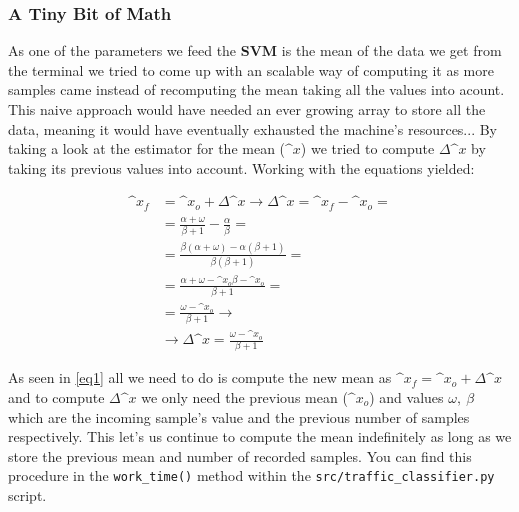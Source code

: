 \documentclass[12pt]{report}
\begin{document}
\begin{itemize}
{{{{			\subsubsection{A Tiny Bit of Math}
				As one of the parameters we feed the \textbf{SVM} is the mean of the data we get from the terminal we tried to come up with an scalable way of computing it as more samples came instead of recomputing the mean taking all the values into acount. This naive approach would have needed an ever growing array to store all the data, meaning it would have eventually exhausted the machine's resources... By taking a look at the estimator for the mean ($\^{x}$) we tried to compute $\Delta\^{x}$ by taking its previous values into account. Working with the equations yielded:

				\begin{equation}
					\label{eq1}
					\begin{split}
						\^{x}_f & = \^{x}_o + \Delta\^{x} \rightarrow \Delta\^{x} = \^{x}_f - \^{x}_o = \\
								& = \frac{\alpha + \omega}{\beta + 1} - \frac{\alpha}{\beta} = \\
								& = \frac{\beta(\alpha + \omega) - \alpha(\beta + 1)}{\beta(\beta + 1)} = \\
								& = \frac{\alpha + \omega - \^{x}_o\beta - \^{x}_o}{\beta + 1} = \\
								& = \frac{\omega - \^{x}_o}{\beta + 1} \rightarrow \\
								& \rightarrow \Delta\^{x} = \frac{\omega - \^{x}_o}{\beta + 1}
					\end{split}
				\end{equation}

				As seen in \ref{eq1} all we need to do is compute the new mean as $\^{x}_f = \^{x}_o + \Delta\^{x}$ and to compute $\Delta\^{x}$ we only need the previous mean ($\^{x}_o$) and values $\omega,\ \beta$ which are the incoming sample's value and the previous number of samples respectively. This let's us continue to compute the mean indefinitely as long as we store the previous mean and number of recorded samples. You can find this procedure in the \texttt{work_time()} method within the \texttt{src/traffic_classifier.py} script.

}}}}
\end{itemize}
\end{document}
